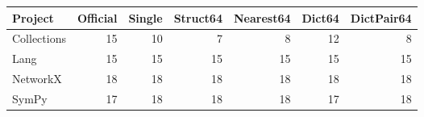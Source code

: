 \begin{tabular}{lrrrrrr}
\toprule
Project & Official & Single & Struct64 & Nearest64 & Dict64 & DictPair64 \\
\midrule
Collections & 15 & 10 & 7 & 8 & 12 & 8 \\
Lang & 15 & 15 & 15 & 15 & 15 & 15 \\
NetworkX & 18 & 18 & 18 & 18 & 18 & 18 \\
SymPy & 17 & 18 & 18 & 18 & 17 & 18 \\
\bottomrule
\end{tabular}
